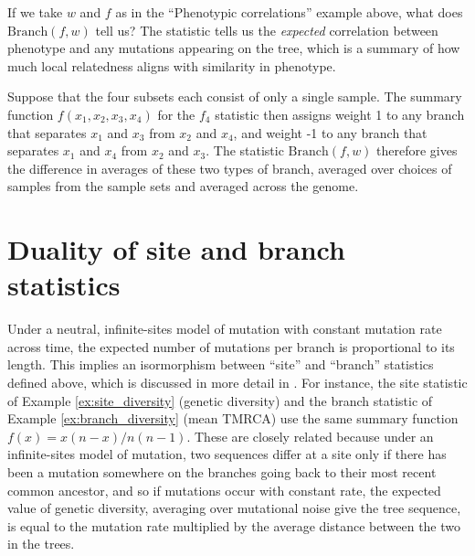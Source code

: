 \documentclass{article}
\newcommand{\branch}{\mbox{Branch}} %
\newcommand{\iw}{w} %
\begin{document}
\begin{example} \label{ex:branch_correlation}
    If we take $\iw$ and $f$ as in the ``Phenotypic correlations'' example above,
    what does $\branch(f, \iw)$ tell us?
    The statistic tells us the \emph{expected} correlation between phenotype and any mutations
    appearing on the tree, which is a summary of how much local relatedness
    aligns with similarity in phenotype.
\end{example}


\begin{example}[Patterson's $f_4$] \label{ex:branch_f4}
    Suppose that the four subsets each consist of only a single sample.
    The summary function $f(x_1, x_2, x_3, x_4)$ for the $f_4$ statistic
    then assigns weight 1 to any branch that separates $x_1$ and $x_3$ from $x_2$ and $x_4$,
    and weight -1 to any branch that separates $x_1$ and $x_4$ from $x_2$ and $x_3$.
    The statistic $\branch(f, \iw)$ therefore 
    gives the difference in averages of these two types of branch,
    averaged over choices of samples from the sample sets and averaged across the genome.
\end{example}

\section*{Duality of site and branch statistics}

Under a neutral, infinite-sites model of mutation with constant mutation rate across time,
the expected number of mutations per branch is proportional to its length.
This implies an isormorphism between ``site'' and ``branch'' statistics defined above,
which is discussed in more detail in \citet{ralph2019empirical}.
For instance, the site statistic of Example \ref{ex:site_diversity} (genetic diversity)
and the branch statistic of Example \ref{ex:branch_diversity} (mean TMRCA)
use the same summary function $f(x) = x(n-x)/n(n-1)$.
These are closely related because under an infinite-sites model of mutation,
two sequences differ at a site only if there has been a mutation somewhere on the branches going back
to their most recent common ancestor, 
and so if mutations occur with constant rate, 
the expected value of genetic diversity, 
averaging over mutational noise give the tree sequence,
is equal to the mutation rate multiplied by the average distance between the two in the trees.
\end{document}
